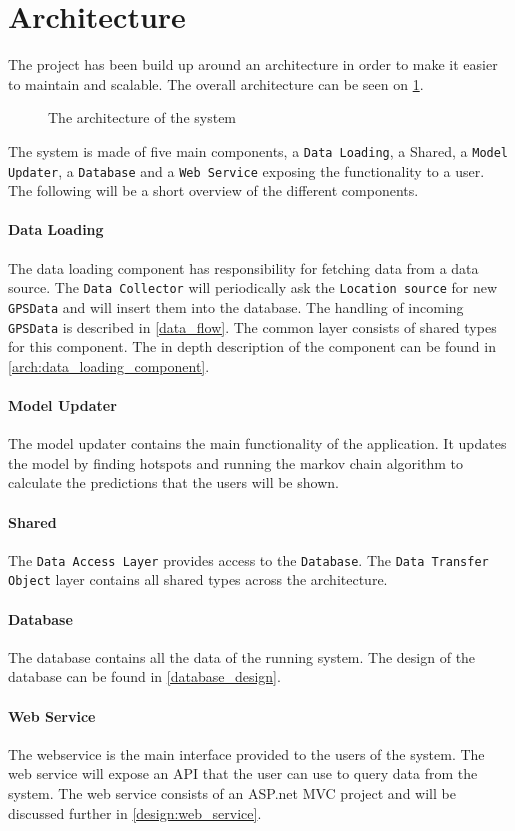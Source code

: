 \section{Architecture}
The project has been build up around an architecture in order to make it easier to maintain and scalable.
The overall architecture can be seen on \cref{arch}.

\begin{figure}[h]
\center

\caption{The architecture of the system}
\label{arch}
\end{figure}

The system is made of five main components, a \texttt{Data Loading}, a Shared, a \texttt{Model Updater}, a \texttt{Database} and a \texttt{Web Service} exposing the functionality to a user.
The following will be a short overview of the different components.

\paragraph{Data Loading}
The data loading component has responsibility for fetching data from a data source.
The \texttt{Data Collector} will periodically ask the \texttt{Location source} for new \texttt{GPSData} and will insert them into the database. 
The handling of incoming \texttt{GPSData} is described in  \cref{data_flow}.
The common layer consists of shared types for this component.
The in depth description of the component can be found in \cref{arch:data_loading_component}.

\paragraph{Model Updater}
The model updater contains the main functionality of the application.
It updates the model by finding hotspots and running the markov chain algorithm to calculate the predictions that the users will be shown.

\paragraph{Shared}
The \texttt{Data Access Layer} provides access to the \texttt{Database}.
The \texttt{Data Transfer Object} layer contains all shared types across the architecture.

\paragraph{Database}
The database contains all the data of the running system.
The design of the database can be found in \cref{database_design}.

\paragraph{Web Service}
The webservice is the main interface provided to the users of the system.
The web service will expose an API that the user can use to query data from the system.
The web service consists of an ASP.net MVC project and will be discussed further in \cref{design:web_service}.





